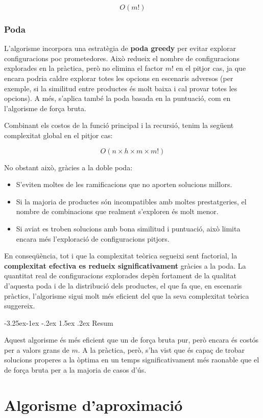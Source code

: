 \documentclass[a4paper,12pt]{report}
\makeatletter
\newcounter{subsubsubsection}[subsubsection]
\newcommand\subsubsubsection{\@startsection{subsubsubsection}{4}{\z@}%
									 {-3.25ex\@plus -1ex \@minus -.2ex}%
									 {1.5ex \@plus .2ex}%
									 {\normalfont\normalsize\bfseries}}
\makeatother
\begin{document}
\begin{itemize}
\[
O(m!)
\]

\subsubsection{Poda}

L'algorisme incorpora una estratègia de \textbf{poda greedy} per evitar explorar configuracions poc prometedores. Això redueix el nombre de configuracions explorades en la pràctica, però no elimina el factor \(m!\) en el pitjor cas, ja que encara podria caldre explorar totes les opcions en escenaris adversos (per exemple, si la similitud entre productes és molt baixa i cal provar totes les opcions).
A més, s'aplica també la poda basada en la puntuació, com en l'algorisme de força bruta.

Combinant els costos de la funció principal i la recursió, tenim la següent complexitat global en el pitjor cas:

\[
O(n \times h \times m \times m!)
\]

No obstant això, gràcies a la doble poda:
\begin{itemize}
    \item S'eviten moltes de les ramificacions que no aporten solucions millors.
    \item Si la majoria de productes són incompatibles amb moltes prestatgeries, el nombre de combinacions que realment s'exploren és molt menor.
    \item Si aviat es troben solucions amb bona similitud i puntuació, això limita encara més l'exploració de configuracions pitjors.
\end{itemize}

En conseqüència, tot i que la complexitat teòrica segueixi sent factorial, la \textbf{complexitat efectiva es redueix significativament} gràcies a la poda. La quantitat real de configuracions explorades depèn fortament de la qualitat d'aquesta poda i de la distribució dels productes, el que fa que, en escenaris pràctics, l'algorisme sigui molt més eficient del que la seva complexitat teòrica suggereix.

\subsubsubsection{Resum}

Aquest algorisme és més eficient que un de força bruta pur, però encara és costós per a valors grans de \(m\). A la pràctica, però, s'ha vist que és capaç de trobar solucions properes a la òptima en un temps significativament més raonable que el de força bruta per a la majoria de casos d'ús.

\section{Algorisme d'aproximació}


\end{itemize}
\end{document}
